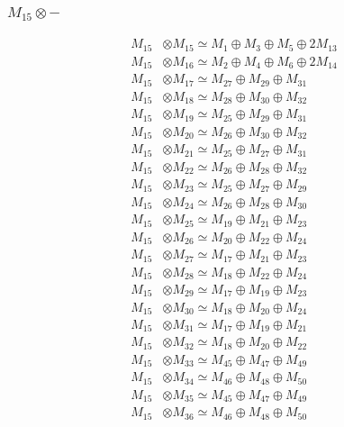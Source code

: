 \subsubsection{$ M_{15}\otimes -$}
\begin{align*}
M_{15} &\otimes M_{15} \simeq M_{1} \oplus M_{3} \oplus M_{5} \oplus 2M_{13} \\
M_{15} &\otimes M_{16} \simeq M_{2} \oplus M_{4} \oplus M_{6} \oplus 2M_{14} \\
M_{15} &\otimes M_{17} \simeq M_{27} \oplus M_{29} \oplus M_{31} \\
M_{15} &\otimes M_{18} \simeq M_{28} \oplus M_{30} \oplus M_{32} \\
M_{15} &\otimes M_{19} \simeq M_{25} \oplus M_{29} \oplus M_{31} \\
M_{15} &\otimes M_{20} \simeq M_{26} \oplus M_{30} \oplus M_{32} \\
M_{15} &\otimes M_{21} \simeq M_{25} \oplus M_{27} \oplus M_{31} \\
M_{15} &\otimes M_{22} \simeq M_{26} \oplus M_{28} \oplus M_{32} \\
M_{15} &\otimes M_{23} \simeq M_{25} \oplus M_{27} \oplus M_{29} \\
M_{15} &\otimes M_{24} \simeq M_{26} \oplus M_{28} \oplus M_{30} \\
M_{15} &\otimes M_{25} \simeq M_{19} \oplus M_{21} \oplus M_{23} \\
M_{15} &\otimes M_{26} \simeq M_{20} \oplus M_{22} \oplus M_{24} \\
M_{15} &\otimes M_{27} \simeq M_{17} \oplus M_{21} \oplus M_{23} \\
M_{15} &\otimes M_{28} \simeq M_{18} \oplus M_{22} \oplus M_{24} \\
M_{15} &\otimes M_{29} \simeq M_{17} \oplus M_{19} \oplus M_{23} \\
M_{15} &\otimes M_{30} \simeq M_{18} \oplus M_{20} \oplus M_{24} \\
M_{15} &\otimes M_{31} \simeq M_{17} \oplus M_{19} \oplus M_{21} \\
M_{15} &\otimes M_{32} \simeq M_{18} \oplus M_{20} \oplus M_{22} \\
M_{15} &\otimes M_{33} \simeq M_{45} \oplus M_{47} \oplus M_{49} \\
M_{15} &\otimes M_{34} \simeq M_{46} \oplus M_{48} \oplus M_{50} \\
M_{15} &\otimes M_{35} \simeq M_{45} \oplus M_{47} \oplus M_{49} \\
M_{15} &\otimes M_{36} \simeq M_{46} \oplus M_{48} \oplus M_{50} \\

\end{align*}
